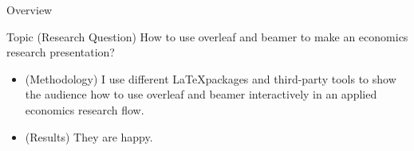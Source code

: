 
\begin{frame}{Overview}

\begin{block}{Topic (Research Question)}
How to use overleaf and beamer to make an economics research presentation?
\end{block}

\begin{itemize}
    \item (Methodology) I use different \LaTeX packages and third-party tools to show the audience how to use overleaf and beamer interactively in an applied economics research flow.
    \item (Results) They are happy.  
\end{itemize}
\end{frame}


